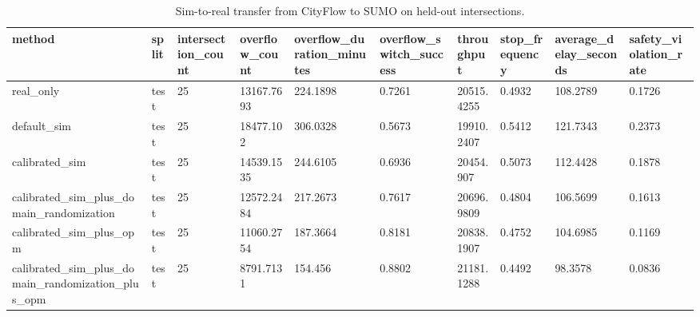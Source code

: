 \begin{table}[t]
\centering
\small
\begin{tabular}{llllllllll}
\toprule
method & split & intersection\_count & overflow\_count & overflow\_duration\_minutes & overflow\_switch\_success & throughput & stop\_frequency & average\_delay\_seconds & safety\_violation\_rate \\
\midrule
real\_only & test & 25 & 13167.7693 & 224.1898 & 0.7261 & 20515.4255 & 0.4932 & 108.2789 & 0.1726 \\
default\_sim & test & 25 & 18477.102 & 306.0328 & 0.5673 & 19910.2407 & 0.5412 & 121.7343 & 0.2373 \\
calibrated\_sim & test & 25 & 14539.1535 & 244.6105 & 0.6936 & 20454.907 & 0.5073 & 112.4428 & 0.1878 \\
calibrated\_sim\_plus\_domain\_randomization & test & 25 & 12572.2484 & 217.2673 & 0.7617 & 20696.9809 & 0.4804 & 106.5699 & 0.1613 \\
calibrated\_sim\_plus\_opm & test & 25 & 11060.2754 & 187.3664 & 0.8181 & 20838.1907 & 0.4752 & 104.6985 & 0.1169 \\
calibrated\_sim\_plus\_domain\_randomization\_plus\_opm & test & 25 & 8791.7131 & 154.456 & 0.8802 & 21181.1288 & 0.4492 & 98.3578 & 0.0836 \\
\bottomrule
\end{tabular}
\caption{Sim-to-real transfer from CityFlow to SUMO on held-out intersections.}
\label{tab:s2r-transfer}
\end{table}
